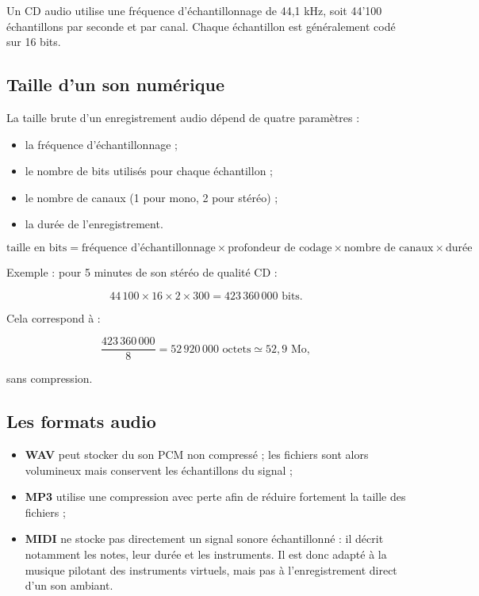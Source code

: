 \documentclass[11pt, a4paper]{book}
\begin{document}
Un CD audio utilise une fréquence d'échantillonnage de 44,1 kHz, soit 44'100
échantillons par seconde et par canal. Chaque échantillon est généralement codé sur
16 bits.

\subsection{Taille d'un son numérique}

La taille brute d'un enregistrement audio dépend de quatre paramètres :
\begin{itemize}
    \item la fréquence d'échantillonnage ;
    \item le nombre de bits utilisés pour chaque échantillon ;
    \item le nombre de canaux (1 pour mono, 2 pour stéréo) ;
    \item la durée de l'enregistrement.
\end{itemize}

\[
\boxed{
\text{taille en bits}
=
\text{fréquence d'échantillonnage}
\times
\text{profondeur de codage}
\times
\text{nombre de canaux}
\times
\text{durée}
}
\]

Exemple : pour 5 minutes de son stéréo de qualité CD :

\[
44\,100 \times 16 \times 2 \times 300
=
423\,360\,000 \text{ bits}.
\]

Cela correspond à :

\[
\frac{423\,360\,000}{8}
=
52\,920\,000 \text{ octets}
\simeq 52{,}9 \text{ Mo},
\]

sans compression.

\subsection{Les formats audio}

\begin{itemize}
    \item \textbf{WAV} peut stocker du son PCM non compressé ; les fichiers sont alors
    volumineux mais conservent les échantillons du signal ;
    \item \textbf{MP3} utilise une compression avec perte afin de réduire fortement la
    taille des fichiers ;
    \item \textbf{MIDI} ne stocke pas directement un signal sonore échantillonné : il
    décrit notamment les notes, leur durée et les instruments. Il est donc adapté à
    la musique pilotant des instruments virtuels, mais pas à l'enregistrement direct
    d'un son ambiant.
\end{itemize}
\end{document}
